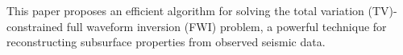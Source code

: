 %
%
This paper proposes an efficient algorithm for solving the total variation (TV)-constrained full waveform inversion (FWI) problem, a powerful technique for reconstructing subsurface properties from observed seismic data.
